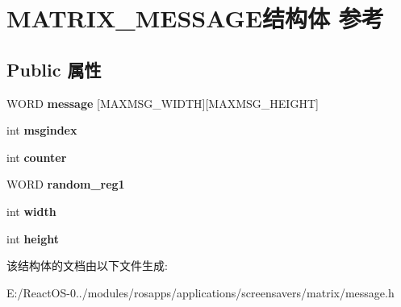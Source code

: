 \hypertarget{struct_m_a_t_r_i_x___m_e_s_s_a_g_e}{}\section{M\+A\+T\+R\+I\+X\+\_\+\+M\+E\+S\+S\+A\+G\+E结构体 参考}
\label{struct_m_a_t_r_i_x___m_e_s_s_a_g_e}
\subsection*{Public 属性}
\begin{DoxyCompactItemize}
\item 
\mbox{\label{struct_m_a_t_r_i_x___m_e_s_s_a_g_e_a7064c0964812f3f64db63f2672aa9aea}} 
W\+O\+RD {\bfseries message} \mbox{[}M\+A\+X\+M\+S\+G\+\_\+\+W\+I\+D\+TH\mbox{]}\mbox{[}M\+A\+X\+M\+S\+G\+\_\+\+H\+E\+I\+G\+HT\mbox{]}
\item 
\mbox{\label{struct_m_a_t_r_i_x___m_e_s_s_a_g_e_a582d3dffdeb9c1add101fa3b6b6a5dad}} 
int {\bfseries msgindex}
\item 
\mbox{\label{struct_m_a_t_r_i_x___m_e_s_s_a_g_e_a83114ef3bc8ed1570a1de2eca5c69e74}} 
int {\bfseries counter}
\item 
\mbox{\label{struct_m_a_t_r_i_x___m_e_s_s_a_g_e_a633da40e15dbadda3034e77061d4ad76}} 
W\+O\+RD {\bfseries random\+\_\+reg1}
\item 
\mbox{\label{struct_m_a_t_r_i_x___m_e_s_s_a_g_e_a520157272f7fc53650ea303c5e4f06b8}} 
int {\bfseries width}
\item 
\mbox{\label{struct_m_a_t_r_i_x___m_e_s_s_a_g_e_a4da728614dab55c1c17b6456bce024af}} 
int {\bfseries height}
\end{DoxyCompactItemize}


该结构体的文档由以下文件生成\+:\begin{DoxyCompactItemize}
\item 
E\+:/\+React\+O\+S-\/0../modules/rosapps/applications/screensavers/matrix/message.\+h\end{DoxyCompactItemize}
